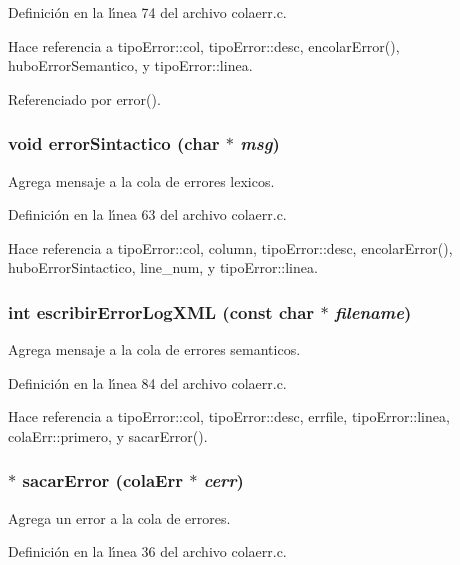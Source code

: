 Definici\'{o}n en la l\'{\i}nea 74 del archivo colaerr.c.

Hace referencia a tipo\-Error::col, tipo\-Error::desc, encolar\-Error(), hubo\-Error\-Semantico, y tipo\-Error::linea.

Referenciado por error().
\subsubsection{\setlength{\rightskip}{0pt plus 5cm}void error\-Sintactico (char $\ast$ {\em msg})}\label{colaerr_8h_a8}


Agrega mensaje a la cola de errores lexicos. 



Definici\'{o}n en la l\'{\i}nea 63 del archivo colaerr.c.

Hace referencia a tipo\-Error::col, column, tipo\-Error::desc, encolar\-Error(), hubo\-Error\-Sintactico, line\_\-num, y tipo\-Error::linea.
\subsubsection{\setlength{\rightskip}{0pt plus 5cm}int escribir\-Error\-Log\-XML (const char $\ast$ {\em filename})}\label{colaerr_8h_a10}


Agrega mensaje a la cola de errores semanticos. 



Definici\'{o}n en la l\'{\i}nea 84 del archivo colaerr.c.

Hace referencia a tipo\-Error::col, tipo\-Error::desc, errfile, tipo\-Error::linea, cola\-Err::primero, y sacar\-Error().
\subsubsection{$\ast$ sacar\-Error ({\bf cola\-Err} $\ast$ {\em cerr})}\label{colaerr_8h_a6}


Agrega un error a la cola de errores. 



Definici\'{o}n en la l\'{\i}nea 36 del archivo colaerr.c.

